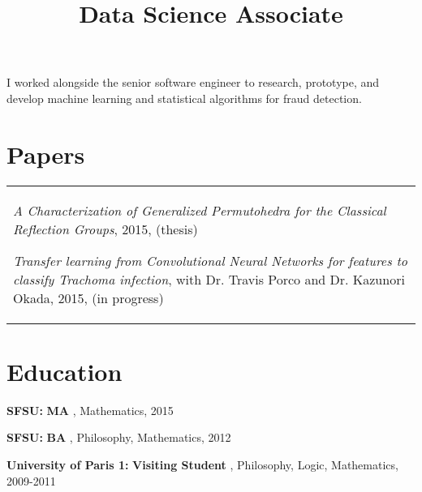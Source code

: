 \documentclass[margin,line,pifont,palatino,courier]{res}
\newenvironment{list1}{
  \begin{list}{\label{ } }{
      \setlength{\itemsep}{0in}
      \setlength{\parsep}{0in} \setlength{\parskip}{0in}
      \setlength{\topsep}{0in} \setlength{\partopsep}{0in}
      \setlength{\leftmargin}{0.0in} } }{\end{list} }
\begin{document}
\begin{resume}
    \title{ Data Science Associate  }

    \begin{position}
    I worked alongside the senior software engineer to research, prototype, and develop machine learning and statistical algorithms for fraud detection.
    \end{position}
  


\section{\sc Papers}
  \begin{tabular}{@{}p{5in}}
    \begin{list1}
      
      
        \item {\em A Characterization of Generalized Permutohedra for the Classical Reflection Groups},  2015, (thesis)  
      \vspace{.2em}
      
        \item {\em Transfer learning from Convolutional Neural Networks for features to classify Trachoma infection},  with Dr. Travis Porco and Dr. Kazunori Okada,  2015, (in progress)  
      \vspace{.2em}
      
    \end{list1}
  \end{tabular}


\section{\sc Education} 
  \begin{list1}
    
    
        \item  {\bf SFSU:}\textbf{ MA }, Mathematics, 2015

          
    
        \item  {\bf SFSU:}\textbf{ BA }, Philosophy, Mathematics, 2012

          
    
        \item  {\bf University of Paris 1:}\textbf{ Visiting Student }, Philosophy, Logic, Mathematics, 2009-2011


\end{list1}
\end{resume}
\end{document}
